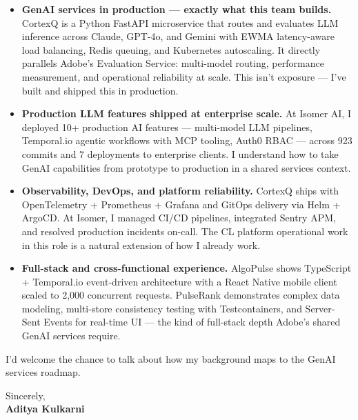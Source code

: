 \documentclass[11pt]{article}
\begin{document}
\begin{itemize}[leftmargin=1.2em, itemsep=4pt]
  \item[\textcolor{AdobeRed}{\faAngleRight}] \textbf{GenAI services in production — exactly what this team builds.} CortexQ is a Python FastAPI microservice that routes and evaluates LLM inference across Claude, GPT-4o, and Gemini with EWMA latency-aware load balancing, Redis queuing, and Kubernetes autoscaling. It directly parallels Adobe's Evaluation Service: multi-model routing, performance measurement, and operational reliability at scale. This isn't exposure — I've built and shipped this in production.
  \item[\textcolor{AdobeRed}{\faAngleRight}] \textbf{Production LLM features shipped at enterprise scale.} At Isomer AI, I deployed 10+ production AI features — multi-model LLM pipelines, Temporal.io agentic workflows with MCP tooling, Auth0 RBAC — across 923 commits and 7 deployments to enterprise clients. I understand how to take GenAI capabilities from prototype to production in a shared services context.
  \item[\textcolor{AdobeRed}{\faAngleRight}] \textbf{Observability, DevOps, and platform reliability.} CortexQ ships with OpenTelemetry + Prometheus + Grafana and GitOps delivery via Helm + ArgoCD. At Isomer, I managed CI/CD pipelines, integrated Sentry APM, and resolved production incidents on-call. The CL platform operational work in this role is a natural extension of how I already work.
  \item[\textcolor{AdobeRed}{\faAngleRight}] \textbf{Full-stack and cross-functional experience.} AlgoPulse shows TypeScript + Temporal.io event-driven architecture with a React Native mobile client scaled to 2,000 concurrent requests. PulseRank demonstrates complex data modeling, multi-store consistency testing with Testcontainers, and Server-Sent Events for real-time UI — the kind of full-stack depth Adobe's shared GenAI services require.
\end{itemize}

\vspace{8pt}

I'd welcome the chance to talk about how my background maps to the GenAI services roadmap.

\vspace{10pt}

Sincerely, \\[4pt]
\textbf{Aditya Kulkarni}
\end{document}
